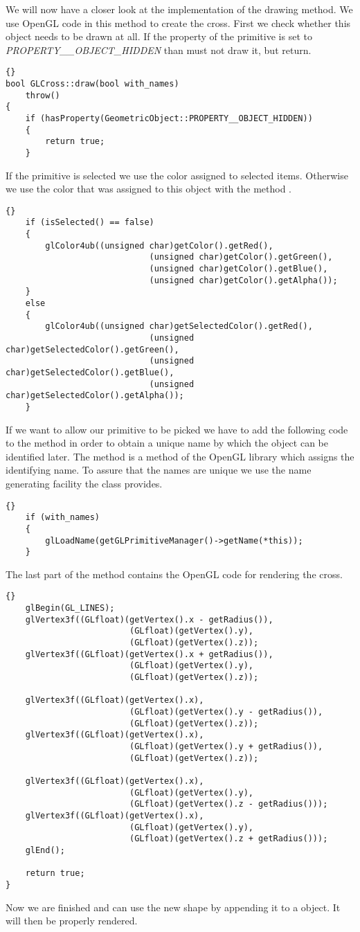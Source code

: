 We will now have a closer look at the implementation of the drawing method. We
use OpenGL code in this method to create the cross. First we check whether
this object needs to be drawn at all. If the property of the primitive is set
to {\em PROPERTY\_\_OBJECT\_HIDDEN} than  must not draw it, but
return.
\begin{lstlisting}{}
bool GLCross::draw(bool with_names)
	throw()
{
	if (hasProperty(GeometricObject::PROPERTY__OBJECT_HIDDEN))
	{
		return true;
	}
\end{lstlisting}
If the primitive is selected we use the color assigned to selected items.
Otherwise we use the color that was assigned to this object with the method
.
\begin{lstlisting}{}
	if (isSelected() == false)
	{
		glColor4ub((unsigned char)getColor().getRed(),
							 (unsigned char)getColor().getGreen(),
							 (unsigned char)getColor().getBlue(),
							 (unsigned char)getColor().getAlpha());
	}
	else
	{
		glColor4ub((unsigned char)getSelectedColor().getRed(),
							 (unsigned char)getSelectedColor().getGreen(),
							 (unsigned char)getSelectedColor().getBlue(),
							 (unsigned char)getSelectedColor().getAlpha());
	}
\end{lstlisting}
If we want to allow our primitive to be picked we have to add the following
code to the  method in order to obtain a unique name by which the
object can be identified later. The method  is a method
of the OpenGL library which assigns the identifying name. To assure that the
names are unique we use the name generating facility the class 
 provides.
\begin{lstlisting}{}
	if (with_names)
	{
		glLoadName(getGLPrimitiveManager()->getName(*this));
	}
\end{lstlisting}
The last part of the method contains the OpenGL code for rendering the cross.
\begin{lstlisting}{}
	glBegin(GL_LINES);
	glVertex3f((GLfloat)(getVertex().x - getRadius()),
						 (GLfloat)(getVertex().y),
						 (GLfloat)(getVertex().z));
	glVertex3f((GLfloat)(getVertex().x + getRadius()),
						 (GLfloat)(getVertex().y),
						 (GLfloat)(getVertex().z));

	glVertex3f((GLfloat)(getVertex().x),
						 (GLfloat)(getVertex().y - getRadius()),
						 (GLfloat)(getVertex().z));
	glVertex3f((GLfloat)(getVertex().x),
						 (GLfloat)(getVertex().y + getRadius()),
						 (GLfloat)(getVertex().z));

	glVertex3f((GLfloat)(getVertex().x),
						 (GLfloat)(getVertex().y),
						 (GLfloat)(getVertex().z - getRadius()));
	glVertex3f((GLfloat)(getVertex().x),
						 (GLfloat)(getVertex().y),
						 (GLfloat)(getVertex().z + getRadius()));
	glEnd();

	return true;
}
\end{lstlisting}
Now we are finished and can use the new shape by appending it to a 
 object. It will then be properly rendered.

